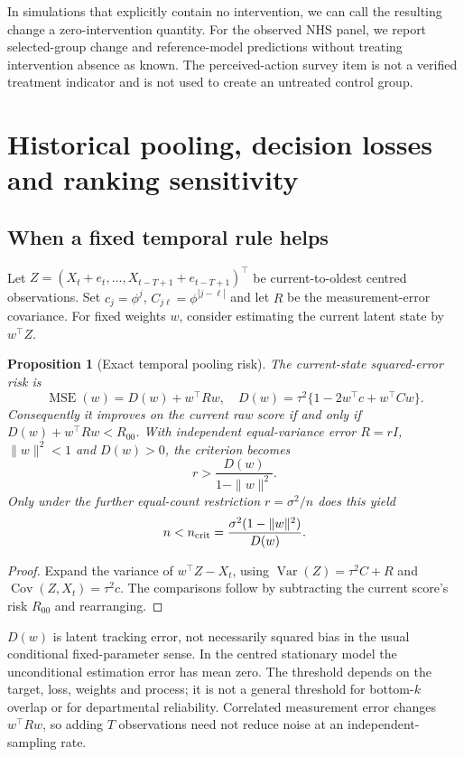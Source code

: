 \documentclass[11pt,letterpaper]{article}
\newtheorem{proposition}{Proposition}
\newcommand{\Var}{\operatorname{Var}}
\newcommand{\Cov}{\operatorname{Cov}}
\newcommand{\MSE}{\operatorname{MSE}}
\begin{document}
In simulations that explicitly contain no intervention, we can call the resulting change a zero-intervention quantity. For the observed NHS panel, we report selected-group change and reference-model predictions without treating intervention absence as known. The perceived-action survey item is not a verified treatment indicator and is not used to create an untreated control group.

\section{Historical pooling, decision losses and ranking sensitivity}
\subsection{When a fixed temporal rule helps}
Let $Z=(X_t+e_t,\ldots,X_{t-T+1}+e_{t-T+1})^\top$ be current-to-oldest centred observations. Set $c_j=\phi^j$, $C_{j\ell}=\phi^{|j-\ell|}$ and let $R$ be the measurement-error covariance. For fixed weights $w$, consider estimating the current latent state by $w^\top Z$.
\begin{proposition}[Exact temporal pooling risk]\label{prop:pooling}
The current-state squared-error risk is
\begin{equation}
 \MSE(w)=D(w)+w^\top Rw,\quad
 D(w)=\tau^2\{1-2w^\top c+w^\top Cw\}.
 \label{eq:pooling_mse}
\end{equation}
Consequently it improves on the current raw score if and only if $D(w)+w^\top Rw<R_{00}$. With independent equal-variance error $R=rI$, $\|w\|^2<1$ and $D(w)>0$, the criterion becomes
\begin{equation}
 r>\frac{D(w)}{1-\|w\|^2}.
 \label{eq:noise_threshold}
\end{equation}
Only under the further equal-count restriction $r=\sigma^2/n$ does this yield
\begin{equation}
 n<n_{\rm crit}=\frac{\sigma^2(1-\|w\|^2)}{D(w)}.
 \label{eq:n_threshold}
\end{equation}
\end{proposition}
\begin{proof}
Expand the variance of $w^\top Z-X_t$, using $\Var(Z)=\tau^2C+R$ and $\Cov(Z,X_t)=\tau^2c$. The comparisons follow by subtracting the current score's risk $R_{00}$ and rearranging.
\end{proof}

$D(w)$ is latent tracking error, not necessarily squared bias in the usual conditional fixed-parameter sense. In the centred stationary model the unconditional estimation error has mean zero. The threshold depends on the target, loss, weights and process; it is not a general threshold for bottom-$k$ overlap or for departmental reliability. Correlated measurement error changes $w^\top Rw$, so adding $T$ observations need not reduce noise at an independent-sampling rate.
\end{document}
